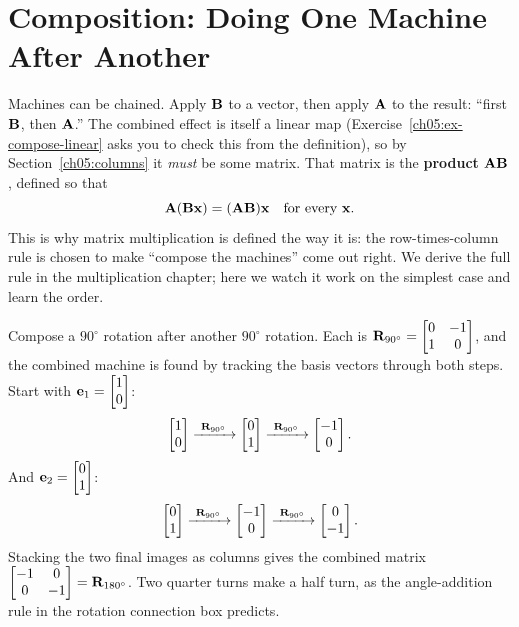 \section{Composition: Doing One Machine After Another}
\label{ch05:composition}

Machines can be chained. Apply $\mathbf{B}$ to a vector, then apply $\mathbf{A}$
to the result: ``first $\mathbf{B}$, then $\mathbf{A}$.'' The combined effect is itself
a linear map (Exercise~\ref{ch05:ex-compose-linear} asks you to check this from the
definition), so by Section~\ref{ch05:columns} it \emph{must} be some matrix. That
matrix is the \textbf{product} $\mathbf{A}\mathbf{B}$, defined so that
\[
  \mathbf{A}(\mathbf{B}\mathbf{x}) = (\mathbf{A}\mathbf{B})\mathbf{x} \quad\text{for every } \mathbf{x}.
\]
This is why matrix multiplication is defined the way it is: the
row-times-column rule is chosen to make ``compose the
machines'' come out right. We derive the full rule in the multiplication
chapter; here we watch it work on the simplest case and learn the order.

\begin{example}
\label{ch05:compose-rot}
Compose a $90^\circ$ rotation after another $90^\circ$ rotation. Each is
$\mathbf{R}_{90^\circ} = \begin{bmatrix} 0 & -1 \\ 1 & 0\end{bmatrix}$, and the
combined machine is found by tracking the basis vectors through both steps. Start
with $\mathbf{e}_1 = \begin{bmatrix}1\\0\end{bmatrix}$:
\[
  \begin{bmatrix}1\\0\end{bmatrix}
  \xrightarrow{\ \mathbf{R}_{90^\circ}\ } \begin{bmatrix}0\\1\end{bmatrix}
  \xrightarrow{\ \mathbf{R}_{90^\circ}\ } \begin{bmatrix}-1\\0\end{bmatrix}.
\]
And $\mathbf{e}_2 = \begin{bmatrix}0\\1\end{bmatrix}$:
\[
  \begin{bmatrix}0\\1\end{bmatrix}
  \xrightarrow{\ \mathbf{R}_{90^\circ}\ } \begin{bmatrix}-1\\0\end{bmatrix}
  \xrightarrow{\ \mathbf{R}_{90^\circ}\ } \begin{bmatrix}0\\-1\end{bmatrix}.
\]
Stacking the two final images as columns gives the combined matrix
$\begin{bmatrix} -1 & 0 \\ 0 & -1\end{bmatrix} = \mathbf{R}_{180^\circ}$. Two quarter
turns make a half turn, as the angle-addition rule in the rotation connection box
predicts.
\end{example}

